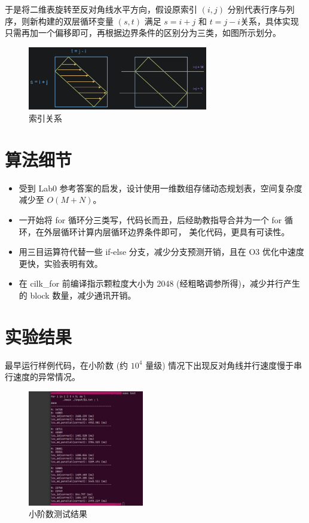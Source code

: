 \documentclass[11pt]{article}
\begin{document}
于是将二维表旋转至反对角线水平方向，假设原索引 $ (i, j) $ 分别代表行序与列序，则新构建的双层循环变量 $ (s, t) $
满足 $ s=i+j $ 和 $ t=j-i $关系，具体实现只需再加一个偏移即可，再根据边界条件的区别分为三类，如图所示划分。

\begin{figure}[H]
	\centering
	\includegraphics[width=0.7\textwidth]{./img/parallel-2.jpg}
	\caption{索引关系}
\end{figure}


\section{算法细节}

\begin{itemize}
	\item 受到 Lab0 参考答案的启发，设计使用一维数组存储动态规划表，空间复杂度减少至 $ O(M+N) $。
	\item 一开始将 for 循环分三类写，代码长而丑，后经助教指导合并为一个 for 循环，在外层循环计算内层循环边界条件即可，
	      美化代码，更具有可读性。
	\item 用三目运算符代替一些 if-else 分支，减少分支预测开销，且在 O3 优化中速度更快，实验表明有效。
	\item 在 cilk\_for 前编译指示颗粒度大小为 2048 (经粗略调参所得)，减少并行产生的 block 数量，减少通讯开销。
\end{itemize}


\section{实验结果}

最早运行样例代码，在小阶数 (约 $ 10^4 $ 量级) 情况下出现反对角线并行速度慢于串行速度的异常情况。

\begin{figure}[H]
	\centering
	\includegraphics[width=0.45\textwidth]{./img/result-1.jpg}
	\caption{小阶数测试结果}
\end{figure}
\end{document}
